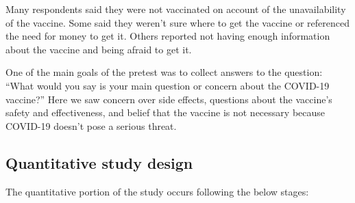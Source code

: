 \documentclass[letterpaper, 12pt, parskip=full,DIV=10]{scrartcl}
\begin{document}
Many respondents said they were not vaccinated on account of the unavailability of the vaccine. Some said they weren’t sure where to get the vaccine or referenced the need for money to get it. Others reported not having enough information about the vaccine and being afraid to get it.

One of the main goals of the pretest was to collect answers to the question:  “What would you say is your main question or concern about the COVID-19 vaccine?” Here we saw concern over side effects, questions about the vaccine’s safety and effectiveness, and belief that the vaccine is not necessary because COVID-19 doesn’t pose a serious threat.

\subsection{Quantitative study design}

The quantitative portion of the study occurs following the below stages: 
\end{document}

